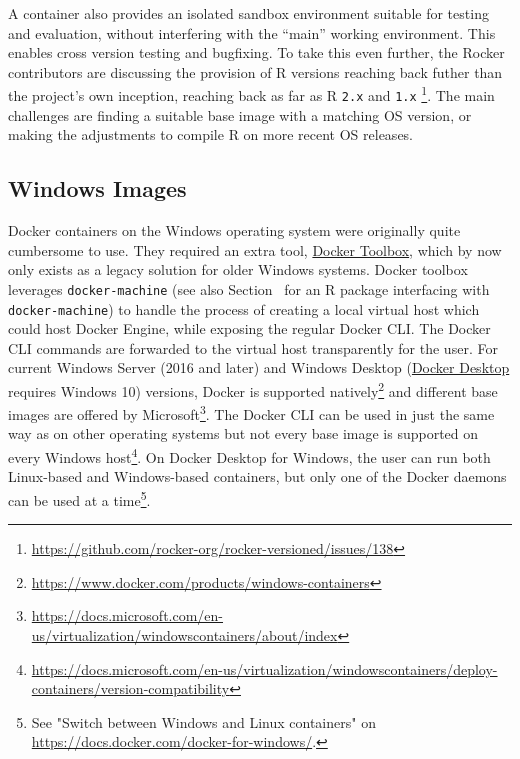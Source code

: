 A container also provides an isolated sandbox environment suitable for
testing and evaluation, without interfering with the ``main'' working
environment. This enables cross version testing and bugfixing. To take
this even further, the Rocker contributors are discussing the provision
of R versions reaching back futher than the project's own inception,
reaching back as far as R \texttt{2.x} and \texttt{1.x}
\footnote{\href{https://github.com/rocker-org/rocker-versioned/issues/138}{https://github.com/rocker-org/rocker-versioned/issues/138}}.
The main challenges are finding a suitable base image with a matching OS
version, or making the adjustments to compile R on more recent OS
releases.

\hypertarget{windows-images}{%
\subsection{Windows Images}\label{windows-images}}

\label{windows}

Docker containers on the Windows operating system were originally quite
cumbersome to use. They required an extra tool,
\href{https://docs.docker.com/toolbox/}{Docker Toolbox}, which by now
only exists as a legacy solution for older Windows systems. Docker
toolbox leverages \texttt{docker-machine} (see also
Section~ for an R package interfacing with
\texttt{docker-machine}) to handle the process of creating a local
virtual host which could host Docker Engine, while exposing the regular
Docker CLI. The Docker CLI commands are forwarded to the virtual host
transparently for the user. For current Windows Server (2016 and later)
and Windows Desktop
(\href{https://www.docker.com/products/docker-desktop}{Docker Desktop}
requires Windows 10) versions, Docker is supported
natively\footnote{\href{https://www.docker.com/products/windows-containers}{https://www.docker.com/products/windows-containers}}
and different base images are offered by
Microsoft\footnote{\href{https://docs.microsoft.com/en-us/virtualization/windowscontainers/about/index}{https://docs.microsoft.com/en-us/virtualization/windowscontainers/about/index}}.
The Docker CLI can be used in just the same way as on other operating
systems but not every base image is supported on every Windows
host\footnote{\href{https://docs.microsoft.com/en-us/virtualization/windowscontainers/deploy-containers/version-compatibility}{https://docs.microsoft.com/en-us/virtualization/windowscontainers/deploy-containers/version-compatibility}}.
On Docker Desktop for Windows, the user can run both Linux-based and
Windows-based containers, but only one of the Docker daemons can be used
at a
time\footnote{See "Switch between Windows and Linux containers" on \href{https://docs.docker.com/docker-for-windows/}{https://docs.docker.com/docker-for-windows/}.}.

